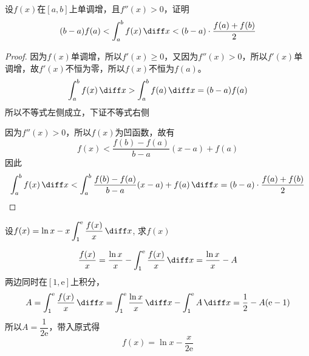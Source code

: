 \begin{example}
    设$f(x)$在$[a,b]$上单调增，且$f''(x)>0$，证明
    \[ (b-a)f(a)<\int_a^bf(x)\,\diff x < (b-a)\cdot\frac{f(a)+f(b)}{2} \]
\end{example}
\begin{marginfigure}
    \caption{$S_\mathrm{A} < S_\mathrm{A}+S_\mathrm{B} < S_\text{A}+S_\mathrm{B}+S_\mathrm{C} $}
\end{marginfigure}
\begin{proof}
    因为$f(x)$单调增，所以$f'(x)\geq 0$，又因为$f''(x)>0$，所以$f'(x)$单调增，故$f'(x)$不恒为零，所以$f(x)$不恒为$f(a)$。
    \[ \int_a^bf(x)\,\diff x > \int_a^b f(a)\,\diff x =(b-a)f(a) \]
    所以不等式左侧成立，下证不等式右侧

    因为$f''(x)>0$，所以$f(x)$为凹函数，故有
    \[ f(x) < \frac{f(b)-f(a)}{b-a}(x-a) + f(a) \]
    因此
    \[
        \int_a^bf(x)\,\diff x
        <
        \int_a^b \frac{f(b)-f(a)}{b-a}(x-a) + f(a) \,\diff x
        =
        (b-a)\cdot\frac{f(a)+f(b)}{2}
    \]
\end{proof}

\begin{example}
    设$\displaystyle f(x) = \ln x - x\int_1^\mathrm{e}\frac{f(x)}{x}\,\diff x$,
    求$f(x)$
\end{example}
\begin{solution}
    \[
        \frac{f(x)}{x} = \frac{\ln x}{x} - \int_1^\mathrm{e}\frac{f(x)}{x}\,\diff x
        =
        \frac{\ln x}{x} - A
    \]
    两边同时在$[1,\mathrm{e}]$上积分，
    \[
        A
        =
        \int_1^\mathrm{e}\frac{f(x)}{x}\,\diff x
        =
        \int_1^\mathrm{e}\frac{\ln x}{x}\,\diff x - \int_1^\mathrm{e} A\,\diff x
        =
        \frac{1}{2} - A(\mathrm{e}-1)
    \]
    所以$A = \dfrac{1}{2\mathrm{e}}$，带入原式得
    \[ f(x) = \ln x - \frac{x}{2\mathrm{e}} \]
\end{solution}

